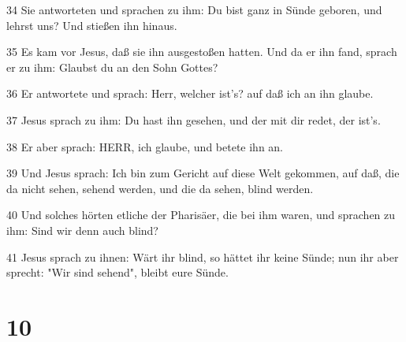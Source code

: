 \par 34 Sie antworteten und sprachen zu ihm: Du bist ganz in Sünde geboren, und lehrst uns? Und stießen ihn hinaus.
\par 35 Es kam vor Jesus, daß sie ihn ausgestoßen hatten. Und da er ihn fand, sprach er zu ihm: Glaubst du an den Sohn Gottes?
\par 36 Er antwortete und sprach: Herr, welcher ist's? auf daß ich an ihn glaube.
\par 37 Jesus sprach zu ihm: Du hast ihn gesehen, und der mit dir redet, der ist's.
\par 38 Er aber sprach: HERR, ich glaube, und betete ihn an.
\par 39 Und Jesus sprach: Ich bin zum Gericht auf diese Welt gekommen, auf daß, die da nicht sehen, sehend werden, und die da sehen, blind werden.
\par 40 Und solches hörten etliche der Pharisäer, die bei ihm waren, und sprachen zu ihm: Sind wir denn auch blind?
\par 41 Jesus sprach zu ihnen: Wärt ihr blind, so hättet ihr keine Sünde; nun ihr aber sprecht: "Wir sind sehend", bleibt eure Sünde.

\chapter{10}

